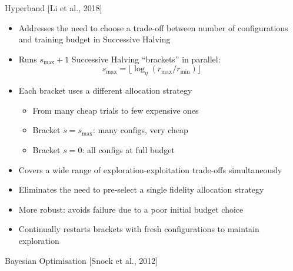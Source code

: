 \documentclass[t,english]{beamer}
\newcommand{\citeref}[1]{{\color{rwth-blue-75}\small[#1]}}
\begin{document}
\begin{frame}{Hyperband \citeref{Li et al., 2018}}
  \begin{itemize}[<+->]
    \item Addresses the need to choose a trade-off between number of configurations and training budget in Successive Halving
    \item Runs $s_{\max}+1$ Successive Halving “brackets” in parallel:
          \[
            s_{\max} = \lfloor \log_\eta (r_{\max} / r_{\min}) \rfloor
            \qquad
          \]
    \item Each bracket uses a different allocation strategy
    \begin{itemize}
    	\item From many cheap trials to few expensive ones
        \item Bracket $s{=}s_{\max}$: many configs, very cheap
        \item Bracket $s{=}0$: all configs at full budget
    \end{itemize}
    \item Covers a wide range of exploration-exploitation trade-offs simultaneously
    \item Eliminates the need to pre-select a single fidelity allocation strategy
    \item More robust: avoids failure due to a poor initial budget choice
    \item Continually restarts brackets with fresh configurations to maintain exploration
  \end{itemize}
\end{frame}

\begin{frame}{Bayesian Optimisation \citeref{Snoek et al., 2012}}
\end{frame}
\end{document}
